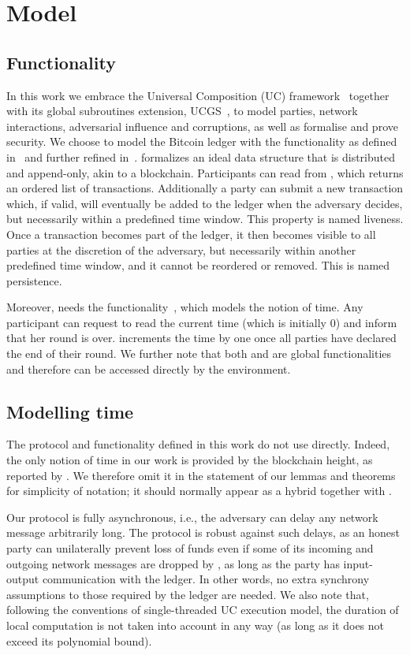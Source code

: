 \section{Model}

  \subsection{\ledger Functionality}
  In this work we embrace the Universal Composition (UC) framework~\cite{uc}
  together with its global subroutines extension,
  UCGS~\cite{DBLP:conf/tcc/BadertscherCHTZ20}, to
  model parties, network interactions, adversarial influence and corruptions, as
  well as formalise and prove security. We choose to model the Bitcoin ledger
  with the \ledger
  functionality as defined in~\cite{BMTZ17} and further refined
  in~\cite{genesis}. \ledger formalizes an ideal data structure that is
  distributed and append-only, akin to a blockchain. Participants can read from
  \ledger, which returns an ordered list of transactions. Additionally a party
  can submit a new transaction which, if valid, will eventually be added to the
  ledger when the adversary decides, but necessarily within a predefined time
  window. This property is named liveness. Once a transaction becomes part of
  the ledger, it then becomes visible to all parties at the discretion of the
  adversary, but necessarily within another predefined time window, and it
  cannot be reordered or removed. This is named persistence.

  Moreover, \ledger needs the \Fclock
  functionality~\cite{DBLP:conf/tcc/KatzMTZ13}, which models the notion of time.
  Any \Fclock participant can request to read the current time (which is
  initially 0) and inform \Fclock that her round is over. \Fclock increments the
  time by one once all parties have declared the end of their round. We further note that both
  \ledger and \Fclock are global
  functionalities~\cite{DBLP:conf/tcc/BadertscherCHTZ20} and therefore can be
  accessed directly by the environment.

  \subsection{Modelling time}
  The protocol and functionality defined in this work do not use \Fclock
  directly. Indeed, the only notion of time in our work is provided by the
  blockchain height, as reported by \ledger. We therefore omit it in the
  statement of our lemmas and theorems for simplicity of notation; it should
  normally appear as a hybrid together with \ledger.

  Our protocol is fully asynchronous, i.e., the adversary can delay any network
  message arbitrarily long. The protocol is robust against such delays, as an
  honest party can unilaterally prevent loss of funds even if some of its
  incoming and outgoing network messages are dropped by \adversary, as long as
  the party has input-output communication with the ledger. In other words, no
  extra synchrony assumptions to those required by the ledger are needed. We
  also note that,
  following the conventions of single-threaded UC execution model, the duration of local
  computation is not taken into account in any way (as long as it does not
  exceed its polynomial bound).
